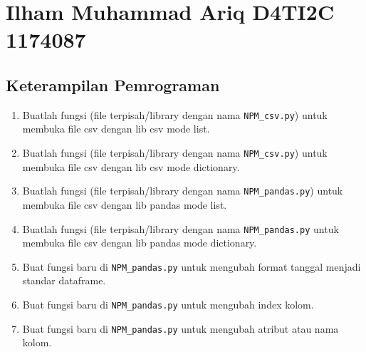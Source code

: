 \section{Ilham Muhammad Ariq D4TI2C 1174087}
\subsection{Keterampilan Pemrograman}
\begin{enumerate}
    \item Buatlah  fungsi  (file  terpisah/library  dengan  nama  \verb|NPM_csv.py|)  untuk  membuka file csv dengan lib csv mode list.
    
    

    \item Buatlah  fungsi  (file  terpisah/library  dengan  nama  \verb|NPM_csv.py|)  untuk  membuka file csv dengan lib csv mode dictionary.
   	
   	

	\item Buatlah fungsi (file terpisah/library dengan nama \verb|NPM_pandas.py|) untuk membuka file csv dengan lib pandas mode list.
	
	
		
	\item Buatlah fungsi (file terpisah/library dengan nama \verb|NPM_pandas.py| untuk membuka file csv dengan lib pandas mode dictionary.

	

	\item Buat fungsi baru di \verb|NPM_pandas.py| untuk mengubah format tanggal menjadi standar dataframe.

	

	\item Buat fungsi baru di \verb|NPM_pandas.py| untuk mengubah index kolom.
	
	
	
	\item Buat fungsi baru di \verb|NPM_pandas.py| untuk mengubah atribut atau nama kolom.
	

\end{enumerate}
